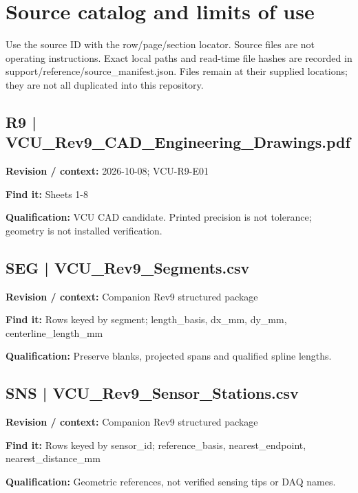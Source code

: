 \documentclass[11pt]{article}
\begin{document}
\clearpage\section{Source catalog and limits of use}\label{sources-detail}
Use the source ID with the row/page/section locator. Source files are not operating instructions. Exact local paths and read-time file hashes are recorded in support/reference/source\_manifest.json. Files remain at their supplied locations; they are not all duplicated into this repository.
\par\noindent\begin{minipage}{\textwidth}\small
\subsection*{R9 | VCU\_\allowbreak{}Rev9\_\allowbreak{}CAD\_\allowbreak{}Engineering\_\allowbreak{}Drawings.pdf}
\textbf{Revision / context:} 2026-10-08; VCU-R9-E01\par
\textbf{Find it:} Sheets 1-8\par
\textbf{Qualification:} VCU CAD candidate. Printed precision is not tolerance; geometry is not installed verification.\par
\end{minipage}\par\vspace{5pt}
\par\noindent\begin{minipage}{\textwidth}\small
\subsection*{SEG | VCU\_\allowbreak{}Rev9\_\allowbreak{}Segments.csv}
\textbf{Revision / context:} Companion Rev9 structured package\par
\textbf{Find it:} Rows keyed by segment; length\_\allowbreak{}basis, dx\_\allowbreak{}mm, dy\_\allowbreak{}mm, centerline\_\allowbreak{}length\_\allowbreak{}mm\par
\textbf{Qualification:} Preserve blanks, projected spans and qualified spline lengths.\par
\end{minipage}\par\vspace{5pt}
\par\noindent\begin{minipage}{\textwidth}\small
\subsection*{SNS | VCU\_\allowbreak{}Rev9\_\allowbreak{}Sensor\_\allowbreak{}Stations.csv}
\textbf{Revision / context:} Companion Rev9 structured package\par
\textbf{Find it:} Rows keyed by sensor\_\allowbreak{}id; reference\_\allowbreak{}basis, nearest\_\allowbreak{}endpoint, nearest\_\allowbreak{}distance\_\allowbreak{}mm\par
\textbf{Qualification:} Geometric references, not verified sensing tips or DAQ names.\par
\end{minipage}\par\vspace{5pt}
\end{document}
